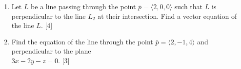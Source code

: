 \documentclass[11pt]{article}
\begin{document}
\newpage

\begin{enumerate}[label=\alph*),resume=Last]
    \item Let \(L\) be a line passing through the point \(\bar{p} = \langle2,0,0\rangle\) such that \(L\) is
    perpendicular to the line \(L_2\) at their intersection. Find a vector equation of the line \(L\). \hfill [4]
    \vspace{10cm}
    \item Find the equation of the line through the point \(\bar{p} = \langle2,-1,4\rangle\) and perpendicular to the
    plane\\ \(3x-2y-z=0\). \hfill [3]
\end{enumerate}
\end{document}
